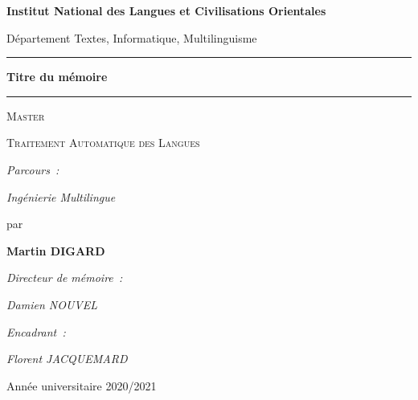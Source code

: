 \begin{center}
{\Large \textbf{Institut National des Langues et Civilisations Orientales}}


{\normalsize Département Textes, Informatique, Multilinguisme}

\hrule
{}
{\LARGE \textbf{Titre du mémoire}}
\hrule


{\Huge \textsc{Master}}


{\LARGE \textsc{Traitement Automatique des Langues}}


{\normalsize \emph{Parcours~:}}


{\normalsize \emph{Ingénierie Multilingue}}


{\large par}


\textbf{{\LARGE Martin \textsc{DIGARD}}}


{\normalsize \emph{Directeur de mémoire~:}}


{\normalsize \emph{Damien NOUVEL}}


{\normalsize \emph{Encadrant~:}}


{\normalsize \emph{Florent JACQUEMARD}}


{\normalsize Année universitaire 2020/2021}

\end{center}

\cleardoublepage %
